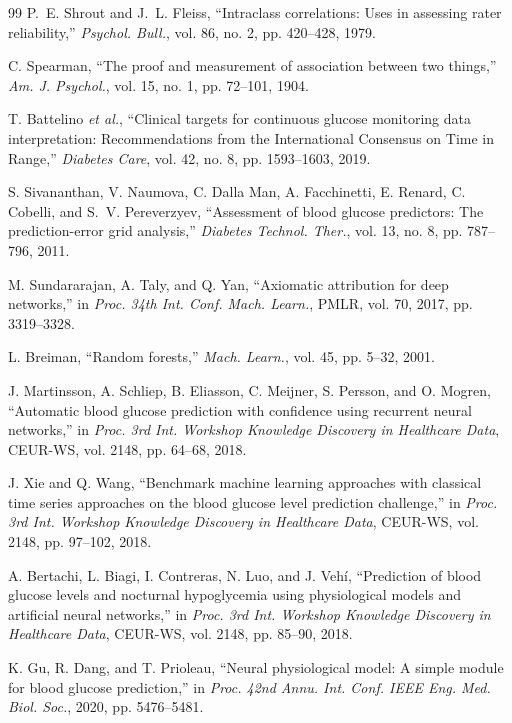 \documentclass[journal]{IEEEtran}
\begin{document}
\begin{thebibliography}{99}
 P.~E. Shrout and J.~L. Fleiss, ``Intraclass correlations: Uses in assessing rater reliability,'' \emph{Psychol. Bull.}, vol. 86, no. 2, pp. 420--428, 1979.

 C. Spearman, ``The proof and measurement of association between two things,'' \emph{Am. J. Psychol.}, vol. 15, no. 1, pp. 72--101, 1904.

 T. Battelino \emph{et al.}, ``Clinical targets for continuous glucose monitoring data interpretation: Recommendations from the International Consensus on Time in Range,'' \emph{Diabetes Care}, vol. 42, no. 8, pp. 1593--1603, 2019.

 S. Sivananthan, V. Naumova, C. Dalla Man, A. Facchinetti, E. Renard, C. Cobelli, and S.~V. Pereverzyev, ``Assessment of blood glucose predictors: The prediction-error grid analysis,'' \emph{Diabetes Technol. Ther.}, vol. 13, no. 8, pp. 787--796, 2011.

 M. Sundararajan, A. Taly, and Q. Yan, ``Axiomatic attribution for deep networks,'' in \emph{Proc. 34th Int. Conf. Mach. Learn.}, PMLR, vol. 70, 2017, pp. 3319--3328.

 L. Breiman, ``Random forests,'' \emph{Mach. Learn.}, vol. 45, pp. 5--32, 2001.

 J. Martinsson, A. Schliep, B. Eliasson, C. Meijner, S. Persson, and O. Mogren, ``Automatic blood glucose prediction with confidence using recurrent neural networks,'' in \emph{Proc. 3rd Int. Workshop Knowledge Discovery in Healthcare Data}, CEUR-WS, vol. 2148, pp. 64--68, 2018.

 J. Xie and Q. Wang, ``Benchmark machine learning approaches with classical time series approaches on the blood glucose level prediction challenge,'' in \emph{Proc. 3rd Int. Workshop Knowledge Discovery in Healthcare Data}, CEUR-WS, vol. 2148, pp. 97--102, 2018.

 A. Bertachi, L. Biagi, I. Contreras, N. Luo, and J. Veh\'i, ``Prediction of blood glucose levels and nocturnal hypoglycemia using physiological models and artificial neural networks,'' in \emph{Proc. 3rd Int. Workshop Knowledge Discovery in Healthcare Data}, CEUR-WS, vol. 2148, pp. 85--90, 2018.

 K. Gu, R. Dang, and T. Prioleau, ``Neural physiological model: A simple module for blood glucose prediction,'' in \emph{Proc. 42nd Annu. Int. Conf. IEEE Eng. Med. Biol. Soc.}, 2020, pp. 5476--5481.


\end{thebibliography}
\end{document}
